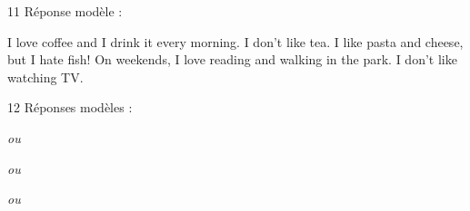 \begin{corrige}{11}
Réponse modèle :
\begin{anglais}
\begin{tcolorbox}[otBase,colback=otGreenTint,colframe=otGreenTint,fontupper=\fontsize{10.4}{14}\selectfont]
I love coffee and I drink it every morning. I don't like tea. I like pasta and cheese, but I hate
fish! On weekends, I love reading and walking in the park. I don't like watching TV.
\end{tcolorbox}
\end{anglais}
\end{corrige}

\begin{corrige}{12}
Réponses modèles :
\begin{reponses}[1]
\item {} \textit{ou} 
\item {} \textit{ou} 
\item {} \textit{ou} 
\item {}
\item {}
\end{reponses}
\end{corrige}

\begin{corrigetest}
\begin{reponses}[5][french]
\item {}
\item {}
\item {}
\item {}
\item {}
\item {}
\item {}
\item {}
\item {}
\item {}
\end{reponses}
\end{corrigetest}
